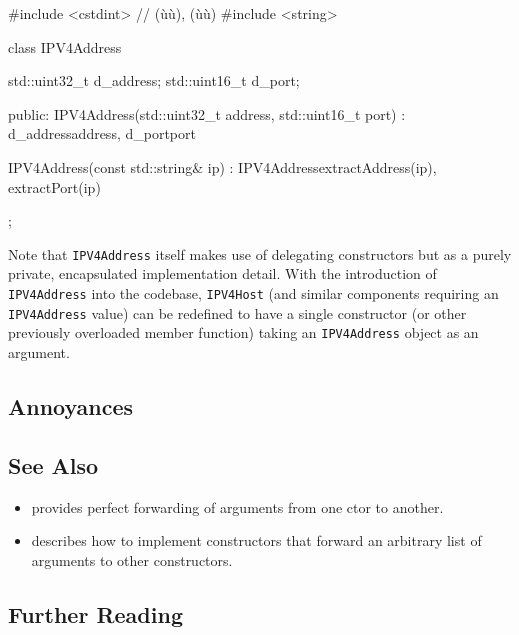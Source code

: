 \begin{emcppslisting}[language=C++]
#include <cstdint> // (ù{}ù), (ù{}ù)
#include <string>

class IPV4Address
{
    std::uint32_t d_address;
    std::uint16_t d_port;

public:
    IPV4Address(std::uint32_t address, std::uint16_t port)
        : d_address{address}, d_port{port}
    {
    }

    IPV4Address(const std::string& ip)
        : IPV4Address{extractAddress(ip), extractPort(ip)}
    {
    }
};
\end{emcppslisting}
    
\noindent Note that \lstinline!IPV4Address! itself makes use of delegating
constructors but as a purely private, encapsulated implementation
detail. With the introduction of \lstinline!IPV4Address! into the codebase,
\lstinline!IPV4Host! (and similar components requiring an
\lstinline!IPV4Address! value) can be redefined to have a single
constructor (or other previously overloaded member function) taking
an \lstinline!IPV4Address! object as an argument.

\subsection[Annoyances]{Annoyances}\label{annoyances}

\hspace*{\fill}

\subsection[See Also]{See Also}\label{see-also}

\begin{itemize}
\item{provides perfect forwarding of arguments from one ctor to another.}
\item{describes how to implement constructors that forward an arbitrary list of arguments to other constructors.}
\end{itemize}

\subsection[Further Reading]{Further Reading}\label{further-reading}

\hspace*{\fill}



